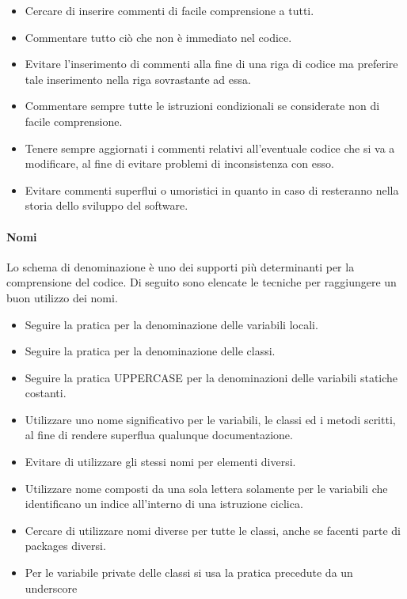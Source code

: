 \begin{itemize}
\item Cercare di inserire commenti di facile comprensione a tutti.

\item Commentare tutto ciò che non è immediato nel codice.

\item Evitare l'inserimento di commenti alla fine di una riga di codice ma preferire tale inserimento nella riga sovrastante ad essa.

\item Commentare sempre tutte le istruzioni condizionali se considerate non di facile comprensione.

\item Tenere sempre aggiornati i commenti relativi all'eventuale codice che si va a modificare, al fine di evitare problemi di inconsistenza con esso.

\item Evitare commenti superflui o umoristici in quanto in caso di  resteranno nella storia dello sviluppo del software.
\end{itemize}

\paragraph{Nomi}
Lo schema di denominazione è uno dei supporti più determinanti per la comprensione del codice.
Di seguito sono elencate le tecniche per raggiungere un buon utilizzo dei nomi.

\begin{itemize}
\item Seguire la pratica  per la denominazione delle variabili locali.
\item Seguire la pratica  per la denominazione delle classi.
\item Seguire la pratica UPPER\textunderscore CASE per la denominazioni delle variabili statiche costanti.
\item Utilizzare uno nome significativo per le variabili, le classi ed i metodi scritti, al fine di rendere superflua qualunque documentazione.
\item Evitare di utilizzare gli stessi nomi per elementi diversi.
\item Utilizzare nome composti da una sola lettera solamente per le variabili che identificano un indice all'interno di una istruzione ciclica.
\item Cercare di utilizzare nomi diverse per tutte le classi, anche se facenti parte di packages diversi.
\item Per le variabile private delle classi si usa la pratica  precedute da un underscore 
\end{itemize}

